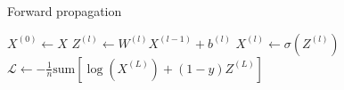 \documentclass[nohyperref]{article}
\theoremstyle{plain}
\theoremstyle{definition}
\theoremstyle{remark}
\begin{document}
%
\begin{algorithm}
\caption{Forward propagation}\label{alg:fwd}
\begin{algorithmic}
	\STATE $X^{(0)} \gets X$
		\STATE $Z^{(l)} \gets W^{(l)}X^{(l-1)}+b^{(l)}$
		\STATE $X^{(l)} \gets \sigma(Z^{(l)} )$
	\ENDFOR
	\STATE $\mathcal{L} \gets -\frac{1}{n} \textrm{sum}{\left[\log(X^{(L)})+(1-y)Z^{(L)}\right]}$
\end{algorithmic}
\end{algorithm}
\end{document}
